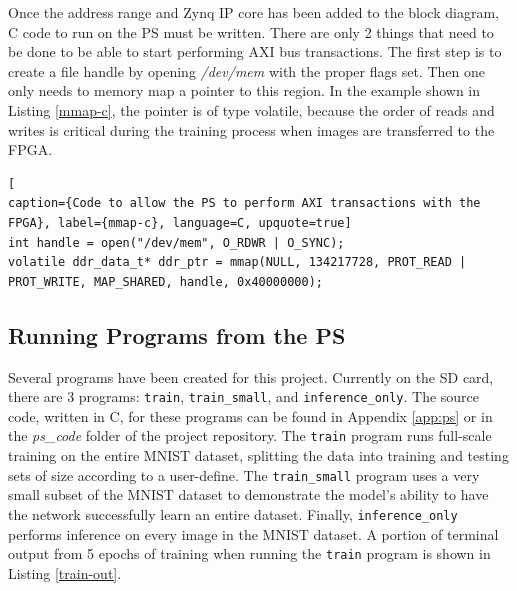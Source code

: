 Once the address range and Zynq IP core has been added to the block diagram, C code to run on the PS must be written. There are only 2 things that need to be done to be able to start performing AXI bus transactions. The first step is to create a file handle by opening \textit{/dev/mem} with the proper flags set. Then one only needs to memory map a pointer to this region. In the example shown in Listing \ref{mmap-c}, the pointer is of type volatile, because the order of reads and writes is critical during the training process when images are transferred to the FPGA.
\begin{lstlisting}[
caption={Code to allow the PS to perform AXI transactions with the FPGA}, label={mmap-c}, language=C, upquote=true]
int handle = open("/dev/mem", O_RDWR | O_SYNC); 
volatile ddr_data_t* ddr_ptr = mmap(NULL, 134217728, PROT_READ | PROT_WRITE, MAP_SHARED, handle, 0x40000000);
\end{lstlisting}

\subsection{Running Programs from the PS}
Several programs have been created for this project. Currently on the SD card, there are 3 programs: \texttt{train}, \texttt{train\_small}, and \texttt{inference\_only}. The source code, written in C, for these programs can be found in Appendix \ref{app:ps} or in the \textit{ps\_code} folder of the project repository. The \texttt{train} program runs full-scale training on the entire MNIST dataset, splitting the data into training and testing sets of size according to a user-define. The \texttt{train\_small} program uses a very small subset of the MNIST dataset to demonstrate the model's ability to have the network successfully learn an entire dataset. Finally, \texttt{inference\_only} performs inference on every image in the MNIST dataset. A portion of terminal output from 5 epochs of training when running  the \texttt{train} program is shown in Listing \ref{train-out}.

